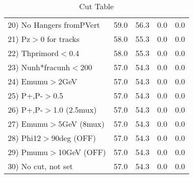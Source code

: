 \begin{table}[h!]
\begin{tabular}{||l||r|r|r|r||}
 20) No Hangers fromPVert &        59.0 &        56.3 &         0.0 &         0.0 \\
 21) Pz$>$0 for tracks    &        58.0 &        55.3 &         0.0 &         0.0 \\
 22) Thprimord$<$0.4      &        58.0 &        55.3 &         0.0 &         0.0 \\
 23) Nunh*fracunh$<$200   &        57.0 &        54.3 &         0.0 &         0.0 \\
 24) Emumu$>$2GeV         &        57.0 &        54.3 &         0.0 &         0.0 \\
 25) P+,P-$>$0.5          &        57.0 &        54.3 &         0.0 &         0.0 \\
 26) P+,P-$>$1.0 (2.5mux) &        57.0 &        54.3 &         0.0 &         0.0 \\
 27) Emumu$>$5GeV  (8mux) &        57.0 &        54.3 &         0.0 &         0.0 \\
 28) Phi12$>$90deg  (OFF) &        57.0 &        54.3 &         0.0 &         0.0 \\
 29) Pmumu$>$10GeV  (OFF) &        57.0 &        54.3 &         0.0 &         0.0 \\
 30) No cut, not set      &        57.0 &        54.3 &         0.0 &         0.0 \\
 \hline
 \hline
 \end{tabular}
 \caption{Cut Table \cohjp  }
 \label{tab-cut__jpsi}
 \end{table}
